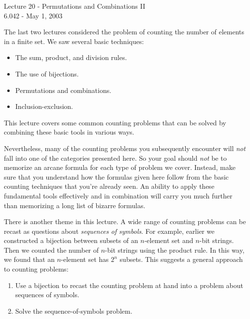 \documentclass[twoside,12pt]{article}
\begin{document}
\begin{center}
{\Large Lecture 20 - Permutations and Combinations II} \\
6.042 - May 1, 2003 \\
\bigskip
\end{center}

The last two lectures considered the problem of counting the number of
elements in a finite set.  We saw several basic techniques:

\begin{itemize}

\item The sum, product, and division rules.

\item The use of bijections.

\item Permutations and combinations.

\item Inclusion-exclusion.

\end{itemize}

\noindent This lecture covers some common counting problems that can
be solved by combining these basic tools in various ways.

Nevertheless, many of the counting problems you subsequently encounter
will {\em not} fall into one of the categories presented here.  So
your goal should {\em not} be to memorize an arcane formula for each
type of problem we cover.  Instead, make sure that you understand how
the formulas given here follow from the basic counting techniques that
you're already seen.  An ability to apply these fundamental tools
effectively and in combination will carry you much further than
memorizing a long list of bizarre formulas.

There is another theme in this lecture.  A wide range of counting
problems can be recast as questions about {\em sequences of symbols}.
For example, earlier we constructed a bijection between subsets of an
$n$-element set and $n$-bit strings.  Then we counted the number of
$n$-bit strings using the product rule.  In this way, we found that an
$n$-element set has $2^n$ subsets.  This suggests a general approach
to counting problems:

\begin{enumerate}

\item Use a bijection to recast the counting problem at hand into a
problem about sequences of symbols.

\item Solve the sequence-of-symbols problem.

\end{enumerate}
\end{document}
